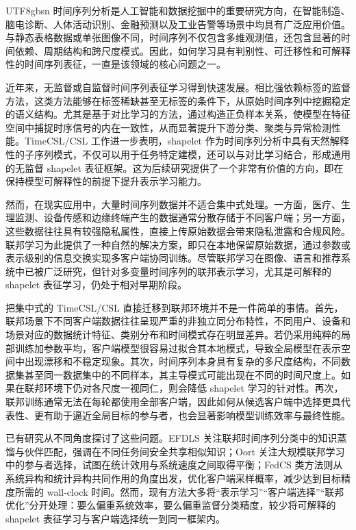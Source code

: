 \documentclass{article}
\begin{document}
\begin{CJK*}{UTF8}{gbsn}
时间序列分析是人工智能和数据挖掘中的重要研究方向，在智能制造、脑电诊断、人体活动识别、金融预测以及工业告警等场景中均具有广泛应用价值。与静态表格数据或单张图像不同，时间序列不仅包含多维观测值，还包含显著的时间依赖、周期结构和跨尺度模式。因此，如何学习具有判别性、可迁移性和可解释性的时间序列表征，一直是该领域的核心问题之一。

近年来，无监督或自监督时间序列表征学习得到快速发展。相比强依赖标签的监督方法，这类方法能够在标签稀缺甚至无标签的条件下，从原始时间序列中挖掘稳定的语义结构。尤其是基于对比学习的方法，通过构造正负样本关系，使模型在特征空间中捕捉时序信号的内在一致性，从而显著提升下游分类、聚类与异常检测性能。TimeCSL/CSL 工作进一步表明，shapelet 作为时间序列分析中具有天然解释性的子序列模式，不仅可以用于任务特定建模，还可以与对比学习结合，形成通用的无监督 shapelet 表征框架\cite{timescsl}。这为后续研究提供了一个非常有价值的方向，即在保持模型可解释性的前提下提升表示学习能力。

然而，在现实应用中，大量时间序列数据并不适合集中式处理。一方面，医疗、生理监测、设备传感和边缘终端产生的数据通常分散存储于不同客户端；另一方面，这些数据往往具有较强隐私属性，直接上传原始数据会带来隐私泄露和合规风险。联邦学习为此提供了一种自然的解决方案，即只在本地保留原始数据，通过参数或表示级别的信息交换实现多客户端协同训练\cite{fedavg}。尽管联邦学习在图像、语言和推荐系统中已被广泛研究，但针对多变量时间序列的联邦表示学习，尤其是可解释的 shapelet 表征学习，仍处于相对早期阶段。

把集中式的 TimeCSL/CSL 直接迁移到联邦环境并不是一件简单的事情。首先，联邦场景下不同客户端数据往往呈现严重的非独立同分布特性，不同用户、设备和场景对应的数据统计特征、类别分布和时间模式存在明显差异。若仍采用纯粹的局部训练加参数平均，客户端模型很容易过拟合其本地模式，导致全局模型在表示空间中出现漂移和不稳定现象。其次，时间序列本身具有复杂的多尺度结构，不同数据集甚至同一数据集中的不同样本，其主导模式可能出现在不同的时间尺度上。如果在联邦环境下仍对各尺度一视同仁，则会降低 shapelet 学习的针对性。再次，联邦训练通常无法在每轮都使用全部客户端，因此如何从候选客户端中选择更具代表性、更有助于逼近全局目标的参与者，也会显著影响模型训练效率与最终性能。

已有研究从不同角度探讨了这些问题。EFDLS 关注联邦时间序列分类中的知识蒸馏与伙伴匹配，强调在不同任务间安全共享相似知识\cite{efdls}；Oort 关注大规模联邦学习中的参与者选择，试图在统计效用与系统速度之间取得平衡\cite{oort}；FedCS 类方法则从系统异构和统计异构共同作用的角度出发，优化客户端采样概率，减少达到目标精度所需的 wall-clock 时间\cite{fedcsadaptive}。然而，现有方法大多将“表示学习”“客户端选择”“联邦优化”分开处理：要么偏重系统效率，要么偏重监督分类精度，较少将可解释的 shapelet 表征学习与客户端选择统一到同一框架内。


\end{CJK*}
\end{document}
